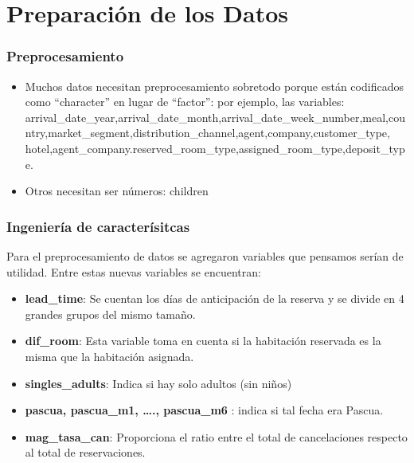 \documentclass[
]{article}
\begin{document}
\hypertarget{preparaciuxf3n-de-los-datos}{%
\section{Preparación de los Datos}\label{preparaciuxf3n-de-los-datos}}

\hypertarget{preprocesamiento}{%
\subsubsection{Preprocesamiento}\label{preprocesamiento}}

\begin{itemize}
\item
  Muchos datos necesitan preprocesamiento sobretodo porque están
  codificados como ``character'' en lugar de ``factor'': por ejemplo,
  las variables:
  arrival\_date\_year,arrival\_date\_month,arrival\_date\_week\_number,meal,country,market\_segment,distribution\_channel,agent,company,customer\_type,
  hotel,agent\_company.reserved\_room\_type,assigned\_room\_type,deposit\_type.
\item
  Otros necesitan ser números: children
\end{itemize}

\hypertarget{ingenieruxeda-de-caracteruxedsitcas}{%
\subsubsection{Ingeniería de
caracterísitcas}\label{ingenieruxeda-de-caracteruxedsitcas}}

Para el preprocesamiento de datos se agregaron variables que pensamos
serían de utilidad. Entre estas nuevas variables se encuentran:

\begin{itemize}
\item
  \textbf{lead\_time}: Se cuentan los días de anticipación de la reserva
  y se divide en 4 grandes grupos del mismo tamaño.
\item
  \textbf{dif\_room}: Esta variable toma en cuenta si la habitación
  reservada es la misma que la habitación asignada.
\item
  \textbf{singles\_adults}: Indica si hay solo adultos (sin niños)
\item
  \textbf{pascua, pascua\_m1, \ldots., pascua\_m6 }: indica si tal fecha
  era Pascua.
\item
  \textbf{mag\_tasa\_can}: Proporciona el ratio entre el total de
  cancelaciones respecto al total de reservaciones.
\end{itemize}
\end{document}
